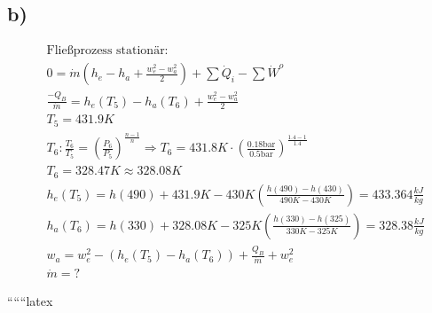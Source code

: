

\subsection*{b)}

\begin{align*}
    &\text{Fließprozess stationär:} \\
    &0 = \dot{m} \left( h_e - h_a + \frac{w_{e}^2 - w_{a}^2}{2} \right) + \sum \dot{Q}_i - \sum \dot{W}^o \\
    &\frac{-Q_B}{\dot{m}} = h_e(T_5) - h_a(T_6) + \frac{w_{e}^2 - w_{a}^2}{2} \\
    &T_5 = 431.9K \\
    &T_6: \frac{T_6}{T_5} = \left( \frac{P_6}{P_5} \right)^{\frac{n-1}{n}} \Rightarrow T_6 = 431.8K \cdot \left( \frac{0.18 \text{bar}}{0.5 \text{bar}} \right)^{\frac{1.4-1}{1.4}} \\
    &T_6 = 328.47K \approx 328.08K \\
    &h_e(T_5) = h(490) + 431.9K - 430K \left( \frac{h(490) - h(430)}{490K - 430K} \right) = 433.364 \frac{kJ}{kg} \\
    &h_a(T_6) = h(330) + 328.08K - 325K \left( \frac{h(330) - h(325)}{330K - 325K} \right) = 328.38 \frac{kJ}{kg} \\
    &w_a = w_e^2 - \left( h_e(T_5) - h_a(T_6) \right) + \frac{Q_B}{\dot{m}} + w_e^2 \\
    &\dot{m} = ?
\end{align*}

``````latex